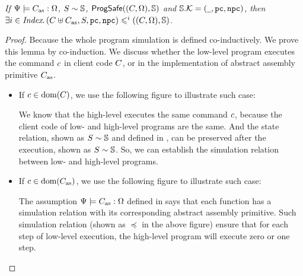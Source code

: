 \begin{lemma}
    \label{lemma:function sim implies whole program sim}
    \em
    If ${\Psi} \models {C_{\text{as}}} : {\Omega}$, 
    ${S} \sim {\mathbb{S}}$, 
    $\textsf{ProgSafe}((C, \Omega), \mathbb{S})$ and 
    $\mathbb{S}.\mathcal{K} = (\underline{\ \,}, \texttt{pc}, \texttt{npc})$, 
    then 
    $\exists i \in \textit{Index}. \, 
    (C\uplus C_{\text{as}}, S, \texttt{pc}, \texttt{npc})
    \leqslant^{i} ((C, \Omega), \mathbb{S})$.  
\end{lemma}
\begin{proof}
    Because the whole program simulation is defined 
    co-inductively. We prove this lemma by co-induction. 
    We discuss whether the low-level program executes 
    the command $c$ in client code $C$, or in 
    the implementation of abstract assembly primitive 
    $C_{\text{as}}$.
    \begin{itemize}
        \item If $c \in \text{dom}(C)$, we use the 
            following figure to illustrate such case:
            \begin{center}
                \vspace*{-0.5em}
                
                \vspace*{-0.5em}
            \end{center} 
            We know that the high-level executes the same command 
            $c$, because the client code of low- and 
            high-level programs are the same.  
            And the state relation, shown as ${S} \sim {\mathbb{S}}$
            and defined in \Sec{\ref{subsec:correctness-primitive}}, 
            can be preserved after the execution, shown 
            as ${S} \sim {\mathbb{S}}$. So, we can 
            establish the simulation relation between 
            low- and high-level programs.  
        
        \item If $c \in \text{dom}(C_{\text{as}})$, we use the 
            following figure to illustrate such case:
            \begin{center}
                \vspace*{-0.5em}
                
                \vspace*{-0.5em}
            \end{center}
            The assumption ${\Psi} \models {C_{\text{as}}} : {\Omega}$ 
            defined in \Def{\ref{def:wdprim-sem}} says that 
            each \sparc{} function has a simulation relation 
            with its corresponding abstract assembly primitive. 
            Such simulation relation 
            (shown as $\preccurlyeq$ in the above figure)
            ensure that for each step 
            of low-level execution, the high-level program will 
            execute zero or one step.
    \end{itemize} 


\end{proof}
